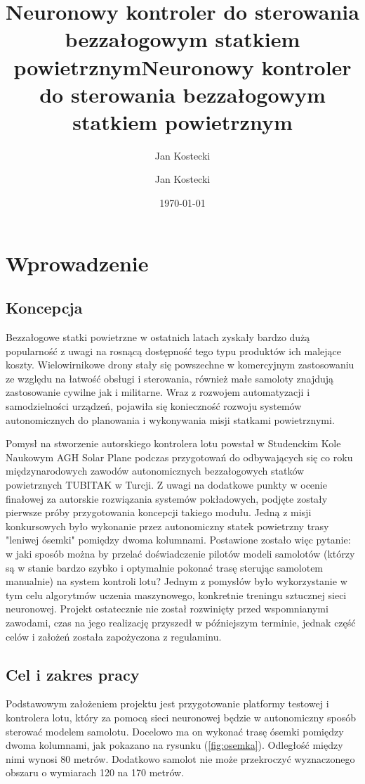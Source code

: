 \documentclass[12pt, a4paper]{article}
\title{Neuronowy kontroler do sterowania bezzałogowym statkiem powietrznym}
\author{Jan Kostecki}
\title{Neuronowy kontroler do sterowania bezzałogowym statkiem powietrznym}
\author{Jan Kostecki}
\date{\today}
\let\oldref\ref
\renewcommand{\ref}[1]{(\oldref{#1})}
\begin{document}
\onehalfspacing


\newpage
\tableofcontents

\clearpage

\section{Wprowadzenie}
\subsection{Koncepcja}

Bezzałogowe statki powietrzne w ostatnich latach zyskały bardzo dużą popularność z uwagi na rosnącą dostępność tego typu produktów ich malejące koszty. Wielowirnikowe drony stały się powszechne w komercyjnym zastosowaniu ze względu na łatwość obsługi i sterowania, również małe samoloty znajdują zastosowanie cywilne jak i militarne. Wraz z rozwojem automatyzacji i samodzielności urządzeń, pojawiła się konieczność rozwoju systemów autonomicznych do planowania i wykonywania misji statkami powietrznymi.

Pomysł na stworzenie autorskiego kontrolera lotu powstał w Studenckim Kole Naukowym AGH Solar Plane podczas przygotowań do odbywających się co roku międzynarodowych zawodów autonomicznych bezzałogowych statków powietrznych TUBITAK w Turcji. Z uwagi na dodatkowe punkty w ocenie finałowej za autorskie rozwiązania systemów pokładowych, podjęte zostały pierwsze próby przygotowania koncepcji takiego modułu. Jedną z misji konkursowych było wykonanie przez autonomiczny statek powietrzny trasy "leniwej ósemki" pomiędzy dwoma kolumnami. Postawione zostało więc pytanie: w jaki sposób można by przelać doświadczenie pilotów modeli samolotów (którzy są w stanie bardzo szybko i optymalnie pokonać trasę sterując samolotem manualnie) na system kontroli lotu? Jednym z pomysłów było wykorzystanie w tym celu algorytmów uczenia maszynowego, konkretnie treningu sztucznej sieci neuronowej. Projekt ostatecznie nie został rozwinięty przed wspomnianymi zawodami, czas na jego realizację przyszedł w późniejszym terminie, jednak część celów i założeń została zapożyczona z regulaminu.

\subsection{Cel i zakres pracy}
Podstawowym założeniem projektu jest przygotowanie platformy testowej i kontrolera lotu, który za pomocą sieci neuronowej będzie w autonomiczny sposób sterować modelem samolotu. Docelowo ma on wykonać trasę ósemki pomiędzy dwoma kolumnami, jak pokazano na rysunku \ref{fig:osemka}. Odległość między nimi wynosi 80 metrów. Dodatkowo samolot nie może przekroczyć wyznaczonego obszaru o wymiarach 120 na 170 metrów.
\end{document}
